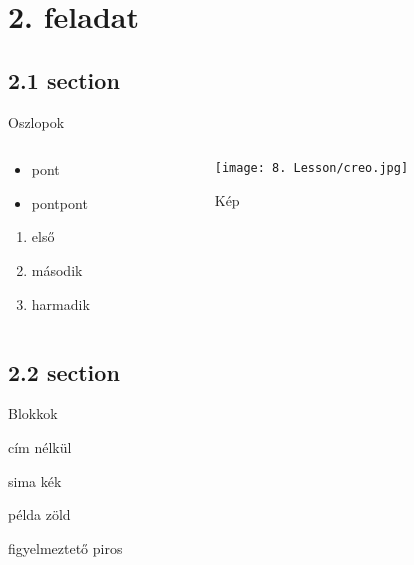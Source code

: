 \documentclass[aspectratio=169, bigger, xcolor=table]{beamer}
\begin{document}
    \section{2. feladat}
        
        \subsection{2.1 section}
        \begin{frame}{Oszlopok}
            \begin{columns}[t]
                \begin{column}{.5\linewidth}
                    \begin{itemize}
                        \item pont
                        \item pontpont
                    \end{itemize}
                    
                    \begin{enumerate}
                        \item első
                        \item második
                        \item harmadik
                    \end{enumerate}
                \end{column}
                
                \begin{column}{.5\linewidth}
                    \begin{figure}
                        \texttt{[image: 8. Lesson/creo.jpg]}
                        \caption{Kép}
                    \end{figure}
                \end{column}
            \end{columns}
        \end{frame}
        
        \subsection{2.2 section}
        \begin{frame}{Blokkok}
            \begin{block}
                cím nélkül
            \end{block}
            
            \begin{block}{sima}
                kék
            \end{block}
            
            \begin{exampleblock}{példa}
                zöld
            \end{exampleblock}
            
            \begin{alertblock}{figyelmeztető}
                piros
            \end{alertblock}
        \end{frame}
        
\end{document}
